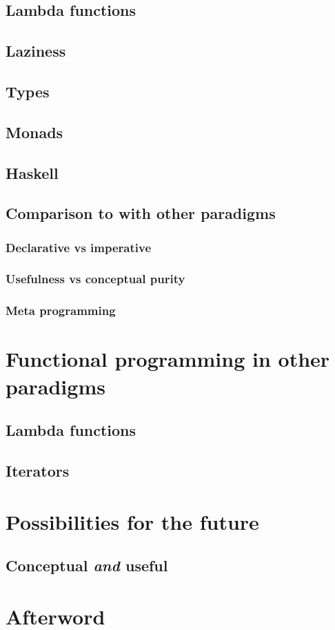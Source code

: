 \documentclass[11pt]{article}
\begin{document}
\subsection{Lambda functions}

\subsection{Laziness}

\subsection{Types}

\subsection{Monads}

\subsection{Haskell}

\subsection{Comparison to with other paradigms}

\subsubsection{Declarative vs imperative}

\subsubsection{Usefulness vs conceptual purity}

\subsubsection{Meta programming}

\section{Functional programming in other paradigms}

\subsection{Lambda functions}

\subsection{Iterators}

\section{Possibilities for the future}

\subsection{Conceptual \emph{and} useful}

\section*{Afterword}

\newpage
\printbibliography[heading=bibintoc, title={References}]
\end{document}
